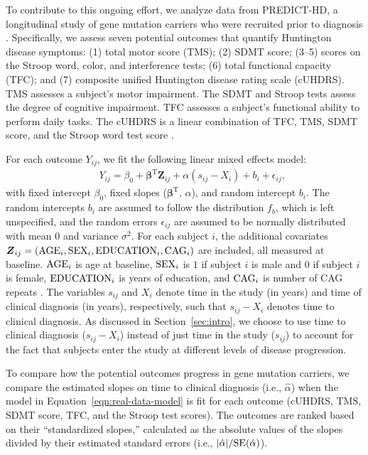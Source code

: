 \documentclass[12pt]{article}
\def\Normal{\hbox{Normal}}
\def\be{\begin{eqnarray}}
\def\ee{\end{eqnarray}}
\def\bbeta{{\boldsymbol{\beta}}}
\def\bZ{{\boldsymbol Z}}
\begin{document}
To contribute to this ongoing effort, we analyze data from PREDICT-HD, a longitudinal study of gene mutation carriers who were recruited prior to diagnosis \citep{paulsen2008detection}. Specifically, we assess seven potential outcomes that quantify Huntington disease symptoms: (1) total motor score (TMS); (2) SDMT score; (3--5) scores on the Stroop word, color, and interference tests; (6) total functional capacity (TFC); and (7) composite unified Huntington disease rating scale (cUHDRS). TMS assesses a subject's motor impairment. The SDMT and Stroop tests assess the degree of cognitive impairment. TFC assesses a subject's functional ability to perform daily tasks. The cUHDRS is a linear combination of TFC, TMS, SDMT score, and the Stroop word test score \citep{schobel2017motor}.

For each outcome $Y_{ij}$, we fit the following linear mixed effects model:
\be
\label{eqn:real-data-model}
&&Y_{ij} = \beta_0 + \bbeta^\textrm{T} \bZ_{ij} + \alpha(s_{ij} - X_i) + b_i + \epsilon_{ij}, %
\ee
with fixed intercept $\beta_0$, fixed slopes ($\bbeta^\textrm{T}$, $\alpha$), and random intercept $b_i$. The random intercepts $b_i$ are assumed to follow the distribution $f_b$, which is left unspecified, and the random errors $\epsilon_{ij}$ are assumed to be normally distributed with mean $0$ and variance $\sigma^2$. For each subject $i$, the additional covariates $\bZ_{ij}=({\rm AGE}_i,{\rm SEX}_i,{\rm EDUCATION}_i,{\rm CAG}_i)$ are included, all measured at baseline. ${\rm AGE}_i$ is age at baseline, ${\rm SEX}_i$ is $1$ if subject $i$ is male and $0$ if subject $i$ is female, ${\rm EDUCATION}_i$ is years of education, and ${\rm CAG}_i$ is number of CAG repeats \citep{paulsen2014clinical}.
The variables $s_{ij}$ and $X_i$ denote time in the study (in years) and time of clinical diagnosis (in years), respectively, such that $s_{ij} - X_i$ denotes time to clinical diagnosis. As discussed in Section~\ref{sec:intro}, we choose to use time to clinical diagnosis ($s_{ij} - X_i$) instead of just time in the study ($s_{ij}$) to account for the fact that subjects enter the study at different levels of disease progression. %

To compare how the potential outcomes progress in gene mutation carriers, we compare the estimated slopes on time to clinical diagnosis (i.e., $\hat{\alpha}$) when the model in Equation~\eqref{eqn:real-data-model} is fit for each outcome (cUHDRS, TMS, SDMT score, TFC, and the Stroop test scores). The outcomes are ranked based on their ``standardized slopes,'' calculated as the absolute values of the slopes divided by their estimated standard errors  (i.e., $|\hat{\alpha}|/{\rm SE}(\hat{\alpha})$).
\end{document}
